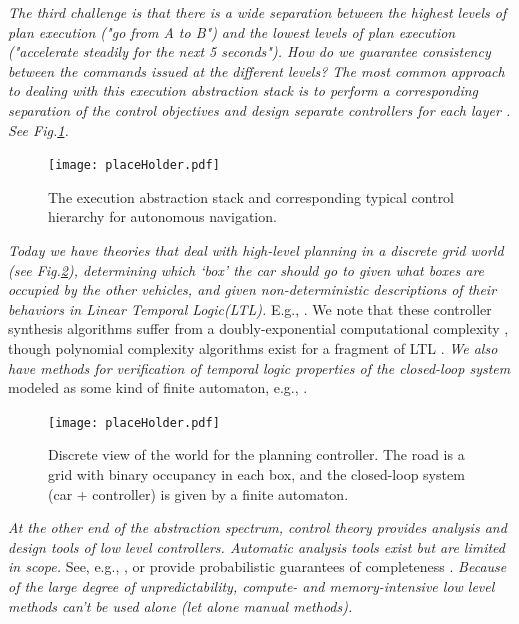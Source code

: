 {\it The third challenge is that there is a wide separation between the highest levels of plan execution ("go from A to B") and the lowest levels of plan execution ("accelerate steadily for the next 5 seconds"). How do we guarantee consistency between the commands issued at the different levels?
The most common approach to dealing with this \emph{execution abstraction stack} is to perform a corresponding separation of the control objectives and design separate controllers for each layer \cite{UrmsonX07_Tartan}. See Fig.\ref{fig:tartanHierarchy}.
\begin{figure}[tb]
	\label{fig:tartanHierarchy}
	\texttt{[image: placeHolder.pdf]}
	\caption{The execution abstraction stack and corresponding typical control hierarchy for autonomous navigation.}
\end{figure}

{\it Today we have theories that deal with \emph{high-level planning in a discrete grid world} (see Fig.\ref{fig:discreteview}), determining which `box' the car should go to given what boxes are occupied by the other vehicles, and given non-deterministic descriptions of their behaviors in Linear Temporal Logic(LTL).
}
E.g., \cite{WongpiromsarnTM10hscc,RamanK13_ImpossibleBehaviors}.
We note that these controller synthesis algorithms suffer from a doubly-exponential computational complexity \cite{PnueliR89}, though polynomial complexity algorithms exist for a fragment of LTL \cite{KleinP10_RevisitingGR1}.
{\it We also have methods for verification of temporal logic properties of the closed-loop system} modeled as some kind of finite automaton, e.g., \cite{Bouyer06latin}.
\begin{figure}[tb]
	\label{fig:discreteview}
	\texttt{[image: placeHolder.pdf]}
	\caption{Discrete view of the world for the planning controller. The road is a grid with binary occupancy in each box, and the closed-loop system (car + controller) is given by a finite automaton.}
\end{figure}
{\it At the other end of the abstraction spectrum, control theory provides analysis and design tools of low level controllers. Automatic analysis tools exist \cite{KloetzerB08tac} but are limited in scope.}
See, e.g., , or provide probabilistic guarantees of completeness .
{\it Because of the large degree of unpredictability, compute- and memory-intensive low level methods can't be used alone (let alone manual methods). }

}
